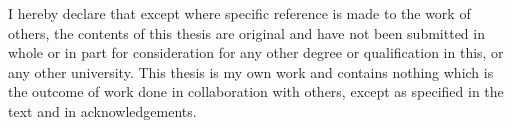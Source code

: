 
\begin{declaration}

I hereby declare that except where specific reference is made to the work of 
others, the contents of this thesis are original and have not been 
submitted in whole or in part for consideration for any other degree or 
qualification in this, or any other university. This thesis is my own 
work and contains nothing which is the outcome of work done in collaboration 
with others, except as specified in the text and in acknowledgements.\\ \\ \\ \\


\end{declaration}
